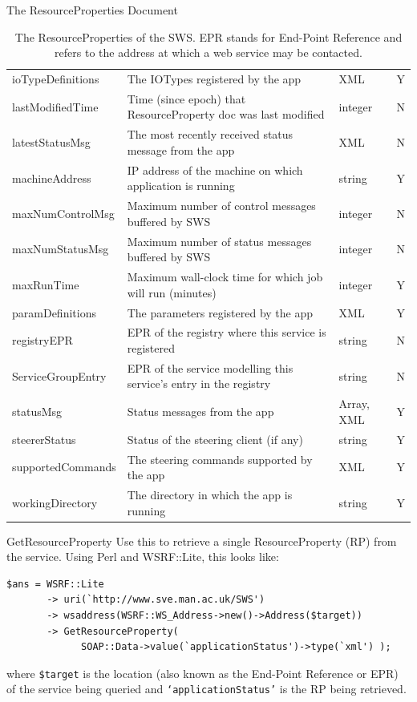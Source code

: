 \documentclass[a4paper]{article}
\begin{document}
\begin{section}{The ResourceProperties Document}
\begin{table}
\begin{center}
\begin{tabular}{l|p{6cm}|l|c}
ioTypeDefinitions  & The IOTypes registered by the app & XML & Y \\
lastModifiedTime   & Time (since epoch) that ResourceProperty doc was last modified & integer & N\\
latestStatusMsg    & The most recently received status message from the app & XML & N\\
machineAddress     & IP address of the machine on which application is running & string & Y\\
maxNumControlMsg   & Maximum number of control messages buffered by SWS & integer & N\\
maxNumStatusMsg    & Maximum number of status messages buffered by SWS & integer & N\\
maxRunTime         & Maximum wall-clock time for which job will run (minutes) & integer & Y\\
paramDefinitions   & The parameters registered by the app & XML & Y\\
registryEPR        & EPR of the registry where this service is registered & string & N\\
ServiceGroupEntry  & EPR of the service modelling this service's entry in the registry & string & N\\
statusMsg          & Status messages from the app & Array, XML & Y\\
steererStatus      & Status of the steering client (if any) & string & Y\\
supportedCommands  & The steering commands supported by the app & XML & Y\\
workingDirectory   & The directory in which the app is running & string & Y\\
\hline\hline
\end{tabular}
\end{center}
\caption{The ResourceProperties of the SWS.  EPR stands for End-Point
Reference and refers to the address at which a web service may be
contacted.}
\label{tab:resourceProps}
\end{table}

\begin{subsection}{GetResourceProperty}
Use this to retrieve a single ResourceProperty (RP) from the service.  Using
Perl and WSRF::Lite, this looks like:
\begin{verbatim}
$ans = WSRF::Lite
       -> uri(`http://www.sve.man.ac.uk/SWS')
       -> wsaddress(WSRF::WS_Address->new()->Address($target))
       -> GetResourceProperty( 
             SOAP::Data->value(`applicationStatus')->type(`xml') );
\end{verbatim}
where \texttt{\$target} is the location (also known as the End-Point
Reference or EPR) of the service being queried and
\texttt{`applicationStatus'} is the RP being retrieved.
\end{subsection}


\end{section}
\end{document}
